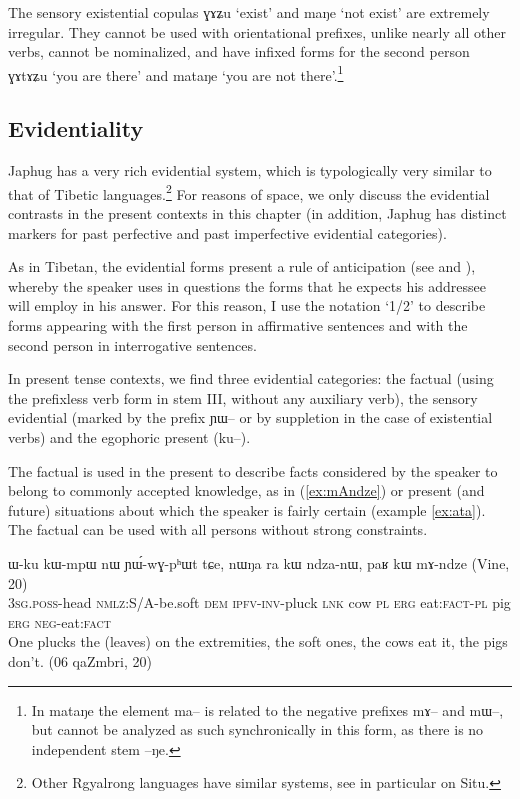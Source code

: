 \documentclass[oldfontcommands,oneside,a4paper,11pt]{article}
\newcommand{\ipa}[1]{{\phon#1}} %
\newcommand{\refb}[1]{(\ref{#1})}
\newcommand{\factual}[1]{\textsc{:fact}}
\begin{document}
The sensory existential copulas \ipa{ɣɤʑu} `exist' and \ipa{maŋe} `not exist' are extremely irregular. They cannot be used with orientational prefixes, unlike nearly all other verbs, cannot be nominalized, and have infixed forms for the second person \ipa{ɣɤtɤʑu} `you are there' and \ipa{mataŋe} `you are not there'.\footnote{In \ipa{mataŋe}  the element \ipa{ma--} is related to the negative prefixes \ipa{mɤ--}  and \ipa{mɯ--}, but cannot be analyzed as such synchronically in this form, as there is no independent stem \ipa{--ŋe}.}


\subsection{Evidentiality}
Japhug has a very rich evidential system,  which is typologically very similar to that of Tibetic languages.\footnote{Other Rgyalrong languages have similar systems, see in particular \citet{linyj03tense} on Situ.} For reasons of space, we only discuss the evidential contrasts in the present contexts in this chapter (in addition, Japhug has distinct markers for past perfective and past imperfective evidential categories).

As in Tibetan, the evidential forms present a rule of anticipation (see \citealt{tournadre08conjunct} and \citealt{tournadre14evidentiality}), whereby the speaker uses in questions the forms that he expects his addressee will employ in his answer. For this reason, I use the notation `1/2' to describe forms appearing with the first person in affirmative sentences and with the second person in interrogative sentences. 

In present tense contexts, we find three evidential categories: the factual (using the prefixless verb form in stem III, without any auxiliary verb), the sensory evidential (marked by the prefix \ipa{ɲɯ--} or by suppletion in the case of existential verbs)  and the egophoric present (\ipa{ku--}).

The factual is used in the present to describe facts considered by the speaker to belong to commonly accepted knowledge, as in \refb{ex:mAndze} or present (and future) situations about which the speaker is fairly certain (example \ref{ex:ata}). The factual can be used with all persons without strong constraints.

\begin{exe}
\ex \label{ex:mAndze}
\gll
   	\ipa{ɯ-ku}  	\ipa{kɯ-mpɯ}  	\ipa{nɯ}  	\ipa{ɲɯ́-wɣ-pʰɯt}  	\ipa{tɕe,}  \ipa{nɯŋa}  	\ipa{ra}  	\ipa{kɯ}  	\ipa{ndza-nɯ,}  	\ipa{paʁ}  	\ipa{kɯ}  	\ipa{mɤ-ndze}  
(Vine, 20) \\
\textsc{3sg.poss}-head \textsc{nmlz}:S/A-be.soft \textsc{dem} \textsc{ipfv-inv}-pluck \textsc{lnk} cow \textsc{pl} \textsc{erg} eat:\textsc{fact-pl} pig \textsc{erg} \textsc{neg}-eat\factual{} \\
\glt  One plucks the (leaves) on the extremities, the soft ones, the cows eat it, the pigs don't. (06 qaZmbri, 20)
\end{exe}
\end{document}
